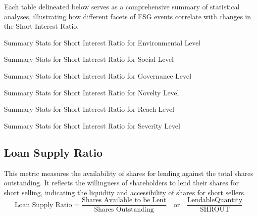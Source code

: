 Each table delineated below serves as a comprehensive summary of statistical analyses, illustrating how different facets of ESG events correlate with changes in the Short Interest Ratio.

\begin{table}[H]
\caption{Summary Stats for Short Interest Ratio for Environmental Level}
\centering

\label{table:short_interest_ratio_environment.tex}
\end{table}

\begin{table}[H]
\caption{Summary Stats for Short Interest Ratio for Social Level}
\centering

\label{table:short_interest_ratio_social.tex}
\end{table}

\begin{table}[H]
\caption{Summary Stats for Short Interest Ratio for Governance Level}
\centering

\label{table:short_interest_ratio_governance.tex}
\end{table}


\begin{table}[H]
\caption{Summary Stats for Short Interest Ratio for Novelty Level}
\centering

\label{table:short_interest_ratio_novelty.tex}
\end{table}

\begin{table}[H]
\caption{Summary Stats for Short Interest Ratio for Reach Level}
\centering

\label{table:short_interest_ratio_reach.tex}
\end{table}

\begin{table}[H]
\caption{Summary Stats for Short Interest Ratio for Severity Level}
\centering

\label{table:short_interest_ratio_severity.tex}
\end{table}


\subsection{Loan Supply Ratio}


This metric measures the availability of shares for lending against the total shares outstanding. It reflects the willingness of shareholders to lend their shares for short selling, indicating the liquidity and accessibility of shares for short sellers.
 \begin{equation}
	\text{Loan Supply Ratio} = \frac{\text{Shares Available to be Lent}}{\text{Shares Outstanding}} \quad \text{or} \quad \frac{\text{LendableQuantity}}{\text{SHROUT}}
	\label{eq:Loan_Supply_Ratio}
\end{equation}

